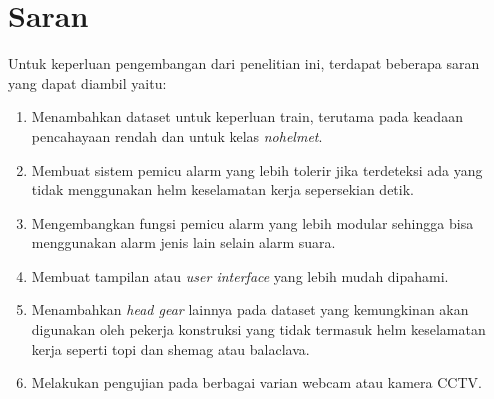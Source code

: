 \section{Saran}
\label{chap:saran}

\par Untuk keperluan pengembangan dari penelitian ini, terdapat beberapa saran yang dapat diambil yaitu:

\begin{enumerate}[nolistsep]

  \item Menambahkan dataset untuk keperluan train, terutama pada keadaan pencahayaan rendah dan untuk kelas \emph{no\textunderscore helmet}.
  

  \item Membuat sistem pemicu alarm yang lebih tolerir jika terdeteksi ada yang tidak menggunakan helm keselamatan kerja sepersekian detik.
  
  \item Mengembangkan fungsi pemicu alarm yang lebih modular sehingga bisa menggunakan alarm jenis lain selain alarm suara.

  \item Membuat tampilan atau \emph{user interface} yang lebih mudah dipahami.

  \item Menambahkan \emph{head gear} lainnya pada dataset yang kemungkinan akan digunakan oleh pekerja konstruksi yang tidak termasuk helm keselamatan kerja seperti topi dan shemag atau balaclava.
  \item Melakukan pengujian pada berbagai varian webcam atau kamera CCTV.

\end{enumerate}
